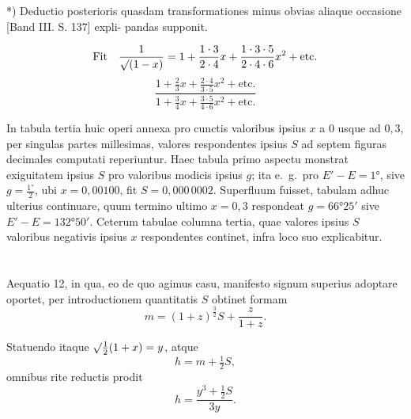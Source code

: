 \documentclass[12pt,a4paper]{article}
\begin{document}
\begin{flushright}
\small\begin{minipage}{0.8\textwidth}
\raggedleft
*) Deductio posterioris quasdam transformationes minus obvias aliaque occasione [Band III. S. 137] expli-\newline
pandas supponit.
\end{minipage}
\end{flushright}

\[
\text{Fit\quad} \frac{1}{\surd(1 - x)} = 1 + \frac{1\cdot 3}{2\cdot 4}x + \frac{1\cdot 3\cdot 5}{2\cdot 4\cdot 6}x^2 + \text{etc.}
\]
\[
\frac{1 + \tfrac{2}{3}x + \tfrac{2\cdot 4}{3\cdot 5}x^2 + \text{etc.}}{1 + \tfrac{3}{4}x + \tfrac{3\cdot 5}{4\cdot 6}x^2 + \text{etc.}}
\]

In tabula tertia huic operi annexa pro cunctis valoribus ipsius $x$ a $0$ usque
ad $0{,}3$, per singulas partes millesimas, valores respondentes ipsius $S$ ad septem
figuras decimales computati reperiuntur. Haec tabula primo aspectu monstrat
exiguitatem ipsius $S$ pro valoribus modicis ipsius $g$; ita e.~g.~pro $E' - E = 1°$,
sive $g = \tfrac{1°}{2}$, ubi $x = 0{,}00100$, fit $S = 0{,}000\,0002$. Superfluum fuisset, tabulam
adhuc ulterius continuare, quum termino ultimo $x = 0{,}3$ respondeat $g = 66°25'$
sive $E' - E = 132°50'$. Ceterum tabulae columna tertia, quae valores ipsius
$S$ valoribus negativis ipsius $x$ respondentes continet, infra loco suo explicabitur.

\section{}

Aequatio 12, in qua, eo de quo agimus casu, manifesto signum superius
adoptare oportet, per introductionem quantitatis $S$ obtinet formam
\begin{equation}
m = (1 + z)^{\frac{3}{2}}S + \frac{z}{1 + z}.
\end{equation}

Statuendo itaque $\surd\frac{1}{2}(1 + x) = y$, atque
\begin{equation}
h = m + \tfrac{1}{2}S,
\end{equation}
omnibus rite reductis prodit
\begin{equation}
\label{eq:15}
h = \frac{y^3 + \tfrac{1}{2}S}{3y}.
\end{equation}
\end{document}
